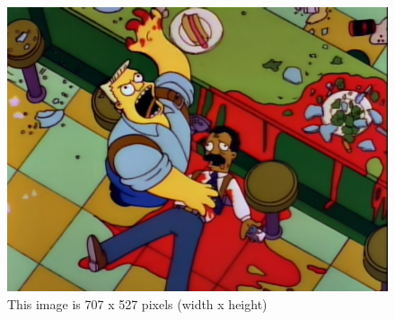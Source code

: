 \documentclass[utf8]{FrontiersinVancouver} %
\begin{document}
\begin{figure}[htbp]
        \begin{center}
        \includegraphics[width=\linewidth]{mendoza.png}
        \end{center}
    \caption{ This image is 707 x 527 pixels (width x height) }\label{fig:mendoza}
\end{figure}




        



\end{document}
